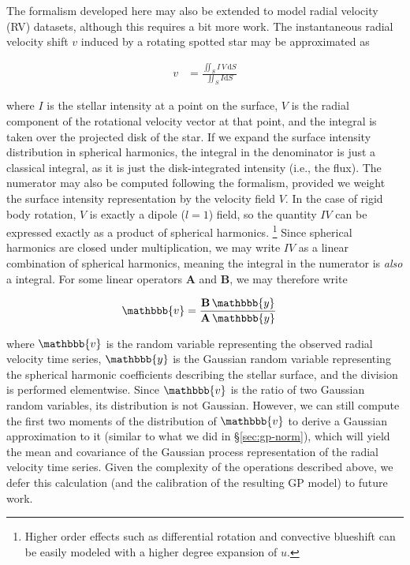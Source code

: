 \documentclass[modern,linenumbers]{aastex62}
\begin{document}
The formalism developed here may also be extended to model radial
velocity (RV) datasets, although this requires a bit more work. The
instantaneous radial
velocity shift $v$ induced by a rotating spotted star may be approximated as
%
\begin{linenomath}\begin{align}
        v & = \frac{\iint_S I \, V \, \mathrm{d} S}{\iint_S I \mathrm{d} S}
    \end{align}\end{linenomath}
%
where $I$ is the stellar intensity at a point on the surface, $V$ is the
radial component of the rotational velocity vector at that point, and the
integral is taken over the projected disk of the star.
%
If we expand the surface intensity distribution in spherical harmonics,
the integral in the denominator is just a classical \starry integral, as it
is just the disk-integrated intensity (i.e., the flux).
%
The numerator may also be computed following the \starry formalism,
provided we weight the surface intensity representation by the velocity
field $V$. In the case of rigid body rotation, $V$ is exactly a dipole ($l = 1$)
field, so the quantity $I V$ can be expressed exactly as a product of
spherical harmonics.%
\footnote{
    Higher order effects such as differential rotation and convective
    blueshift can be easily modeled with a higher degree expansion of $u$.
}
Since spherical harmonics are closed under multiplication,
we may write $I V$ as a linear combination of spherical harmonics, meaning
the integral in the numerator is \emph{also} a \starry integral.
For some linear operators $\mathbf{A}$ and $\mathbf{B}$, we may therefore
write
%
\begin{linenomath}\begin{align}
        \mathbbb{v} & = \frac{\mathbf{B} \, \mathbbb{y}}{\mathbf{A} \, \mathbbb{y}}
    \end{align}\end{linenomath}
%
where $\mathbbb{v}$ is the random variable representing the observed radial
velocity time series,
$\mathbbb{y}$ is the Gaussian random variable representing the spherical harmonic
coefficients describing the stellar surface, and the division is performed
elementwise.
%
Since $\mathbbb{v}$ is the ratio of two Gaussian random variables, its
distribution is not Gaussian. However, we can still compute the first two moments
of the distribution of $\mathbbb{v}$ to derive a Gaussian approximation to it
(similar to what we did in \S\ref{sec:gp-norm}), which will yield the mean
and covariance of the Gaussian process representation of the radial velocity
time series.
%
Given the complexity of the operations described above,
we defer this calculation (and the calibration of the resulting GP model)
to future work.
\end{document}
